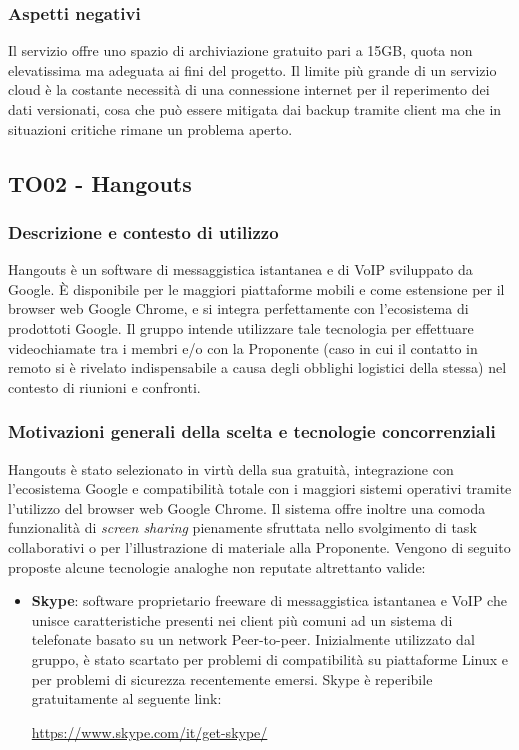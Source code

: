 \documentclass[./../Technology Baseline.tex]{subfiles}
\begin{document}
\subsubsection{Aspetti negativi}
Il servizio offre uno spazio di archiviazione gratuito pari a 15GB, quota non elevatissima ma adeguata ai fini del progetto. Il limite più grande di un servizio cloud è la costante necessità di una connessione internet per il reperimento dei dati versionati, cosa che può essere mitigata dai backup tramite client ma che in situazioni critiche rimane un problema aperto. 

\subsection{TO02 - Hangouts}

\subsubsection{Descrizione e contesto di utilizzo}
Hangouts è un software di messaggistica istantanea e di VoIP sviluppato da Google. È disponibile per le maggiori piattaforme mobili e come estensione per il browser web Google Chrome, e si integra perfettamente con l'ecosistema di prodottoti Google. Il gruppo intende utilizzare tale tecnologia per effettuare videochiamate tra i membri e/o con la Proponente (caso in cui il contatto in remoto si è rivelato indispensabile a causa degli obblighi logistici della stessa) nel contesto di riunioni e confronti.

\subsubsection{Motivazioni generali della scelta e tecnologie concorrenziali}
Hangouts è stato selezionato in virtù della sua gratuità, integrazione con l'ecosistema Google e compatibilità totale con i maggiori sistemi operativi tramite l'utilizzo del browser web Google Chrome. Il sistema offre inoltre una comoda funzionalità di \textit{screen sharing} pienamente sfruttata nello svolgimento di task collaborativi o per l'illustrazione di materiale alla Proponente. Vengono di seguito proposte alcune tecnologie analoghe non reputate altrettanto valide:
\begin{itemize}
	\item \textbf{Skype}: software proprietario freeware di messaggistica istantanea e VoIP che unisce caratteristiche presenti nei client più comuni ad un sistema di telefonate basato su un network Peer-to-peer. Inizialmente utilizzato dal gruppo, è stato scartato per problemi di compatibilità su piattaforme Linux e per problemi di sicurezza recentemente emersi. Skype è reperibile gratuitamente al seguente link:
	\begin{center}
		\url{https://www.skype.com/it/get-skype/}
	\end{center}
\end{itemize}
\end{document}
